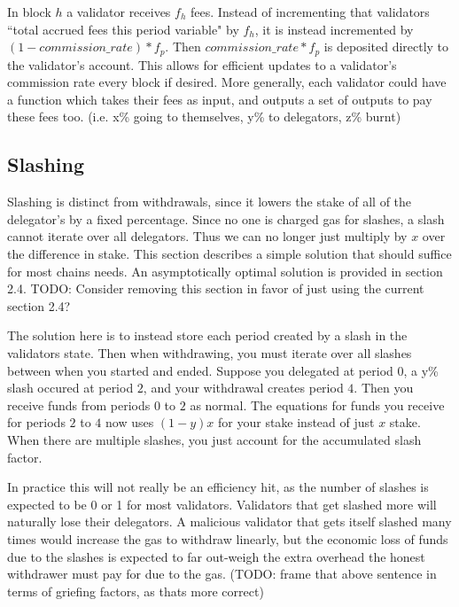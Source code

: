 \documentclass[]{article}
\begin{document}
In block $h$ a validator receives $f_h$ fees.
Instead of incrementing that validators ``total accrued fees this period variable" by $f_h$, it is instead incremented by $(1 - commission\_rate) * f_p$.
Then $commission\_rate * f_p$ is deposited directly to the validator's account.
This allows for efficient updates to a validator's commission rate every block if desired.
More generally, each validator could have a function which takes their fees as input, and outputs a set of outputs to pay these fees too. (i.e. x\% going to themselves, y\% to delegators, z\% burnt)

\subsection{Slashing}
\label{ssec:slashing}
Slashing is distinct from withdrawals, since it lowers the stake of all of the delegator's by a fixed percentage.
Since no one is charged gas for slashes, a slash cannot iterate over all delegators.
Thus we can no longer just multiply by $x$ over the difference in stake.
This section describes a simple solution that should suffice for most chains needs. An asymptotically optimal solution is provided in section 2.4.
TODO: Consider removing this section in favor of just using the current section 2.4?

The solution here is to instead store each period created by a slash in the validators state.
Then when withdrawing, you must iterate over all slashes between when you started and ended.
Suppose you delegated at period $0$, a y\% slash occured at period $2$, and your withdrawal creates period $4$.
Then you receive funds from periods $0$ to $2$ as normal.
The equations for funds you receive for periods $2$ to $4$ now uses $(1 - y)x$ for your stake instead of just $x$ stake.
When there are multiple slashes, you just account for the accumulated slash factor.

In practice this will not really be an efficiency hit, as the number of slashes is expected to be 0 or 1 for most validators.
Validators that get slashed more will naturally lose their delegators.
A malicious validator that gets itself slashed many times would increase the gas to withdraw linearly, but the economic loss of funds due to the slashes is expected to far out-weigh the extra overhead the honest withdrawer must pay for due to the gas.
(TODO: frame that above sentence in terms of griefing factors, as thats more correct)
\end{document}

